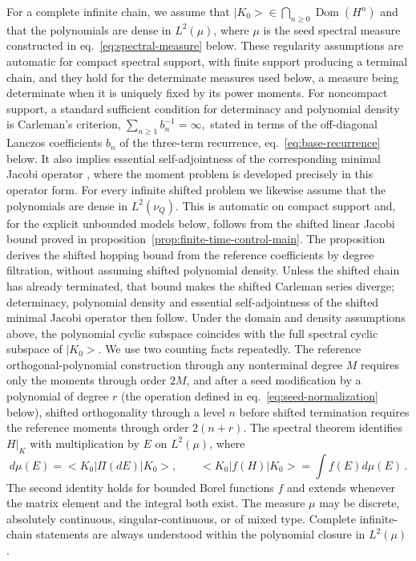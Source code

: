 \documentclass[a4paper,11pt]{article}
\def\ket#1{|#1>}%
\def\bra#1{<#1|}%
\def\dd{d}%
\def\cK{K}%
\theoremstyle{definition}
\theoremstyle{remark}
\newcommand{\ket}[1]{|#1\rangle}
\newcommand{\bra}[1]{\langle #1|}
\newcommand{\dd}{\mathrm d}
\newcommand{\cK}{\mathcal K}
\newcommand{\Dom}{\operatorname{Dom}}
\begin{document}
For a complete infinite chain, we assume that
$\ket{K_0}\in\bigcap_{n\ge0}\Dom(H^n)$ and that the polynomials are dense in $L^2(\mu)$, where
$\mu$ is the seed spectral measure constructed in eq.~\eqref{eq:spectral-measure} below. These
regularity assumptions are automatic for compact spectral support, with finite support producing a
terminal chain, and they hold for the determinate measures used below, a measure being
determinate when it is uniquely fixed by its power moments. For noncompact support, a standard
sufficient condition for determinacy and polynomial density is Carleman's criterion,
$
   \sum_{n\ge1}b_n^{-1}=\infty,
$
stated in terms of the off-diagonal Lanczos coefficients $b_n$ of the three-term recurrence,
eq.~\eqref{eq:base-recurrence} below. It also implies essential self-adjointness of the
corresponding minimal Jacobi operator \cite{SimonMomentProblem1998}, where the moment problem
is developed precisely in this operator form. For every infinite shifted problem we likewise assume that the polynomials are dense in $L^2(\nu_Q)$.  This is automatic on compact support and, for the explicit unbounded models below, follows from the shifted linear Jacobi bound proved in proposition~\ref{prop:finite-time-control-main}. 
The proposition derives the shifted hopping bound from the reference coefficients by degree filtration, without assuming shifted polynomial density. Unless the shifted chain has already terminated, that bound makes the shifted Carleman series diverge; determinacy, polynomial density and essential self-adjointness of the shifted minimal Jacobi operator then follow. Under the domain and density assumptions above, the polynomial cyclic subspace coincides with the
full spectral cyclic subspace of $\ket{K_0}$. We use two counting facts repeatedly.
The reference orthogonal-polynomial construction through any nonterminal degree $M$ requires only
the moments through order $2M$, and after a seed modification by a polynomial of degree $r$ (the operation defined in eq.~\eqref{eq:seed-normalization} below), shifted orthogonality through a level $n$ before shifted termination requires the reference moments through order $2(n+r)$. The spectral theorem identifies $H|_{\cK}$ with multiplication by $E$ on $L^2(\mu)$, where
\begin{equation}
   \dd\mu(E)=\bra{K_0}\Pi(\dd E)\ket{K_0},
   \qquad
   \bra{K_0}f(H)\ket{K_0}=\int f(E)\dd\mu(E)\,.
   \label{eq:spectral-measure}
\end{equation}
The second identity holds for bounded Borel functions $f$ and extends whenever the matrix element and the integral both exist. The measure $\mu$ may be discrete, absolutely continuous, singular-continuous, or of mixed type. Complete infinite-chain statements are always understood within the polynomial closure in $L^2(\mu)$.
\end{document}
